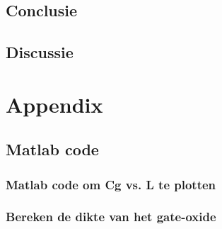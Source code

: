 \documentclass{report}
\begin{document}
\section{Conclusie}
\section{Discussie}



\chapter{Appendix}
\section{Matlab code}
\subsection{Matlab code om Cg vs. L te plotten}
\label{M1}

\subsection{Bereken de dikte van het gate-oxide}
\label{M2}
\end{document}

